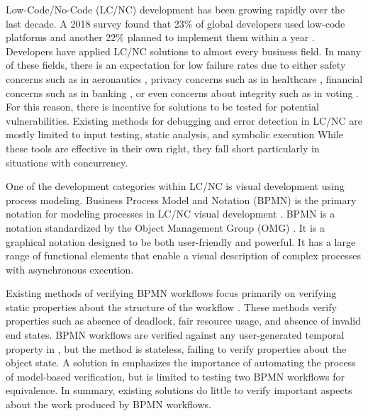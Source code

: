 Low-Code/No-Code (LC/NC) development has been growing rapidly over the last decade. A 2018 survey found that 23\% of global developers used low-code platforms and another 22\% planned to implement them within a year \cite{LowCodeSurvey}. Developers have applied LC/NC solutions to almost every business field. In many of these fields, there is an expectation for low failure rates due to either safety concerns such as in aeronautics \cite{aeronautics1, aeronautics2}, privacy concerns such as in healthcare \cite{healthcare1, healthcare2}, financial concerns such as in banking \cite{banking1,banking2}, or even concerns about integrity such as in voting \cite{voting1, voting2}. For this reason, there is incentive for solutions to be tested for potential vulnerabilities. Existing methods for debugging and error detection in LC/NC are mostly limited to input testing, static analysis, and symbolic execution \cite{LCTesting, BPMNSimulation1} While these tools are effective in their own right, they fall short particularly in situations with concurrency.

One of the development categories within LC/NC is visual development using process modeling.
Business Process Model and Notation (BPMN)\cite{BPMN} is the primary notation for modeling processes in LC/NC visual development \cite{BPMNusage}. BPMN is a notation standardized by the Object Management Group (OMG) \cite{OMG}. It is a graphical notation designed to be both user-friendly and powerful. It has a large range of functional elements that enable a visual description of complex processes with asynchronous execution.

Existing methods of verifying BPMN workflows focus primarily on verifying static properties about the structure of the workflow \cite{bpmnVerification1, bpmnVerification2, ASMverification}. These methods verify properties such as absence of deadlock, fair resource usage, and absence of invalid end states. BPMN workflows are verified against any user-generated temporal property in \cite{bpmnVerification3}, but the method is stateless, failing to verify properties about the object state. A solution in \cite{bpmnVerification4} emphasizes the importance of automating the process of model-based verification, but is limited to testing two BPMN workflows for equivalence. In summary, existing solutions do little to verify important aspects about the work produced by BPMN workflows.

